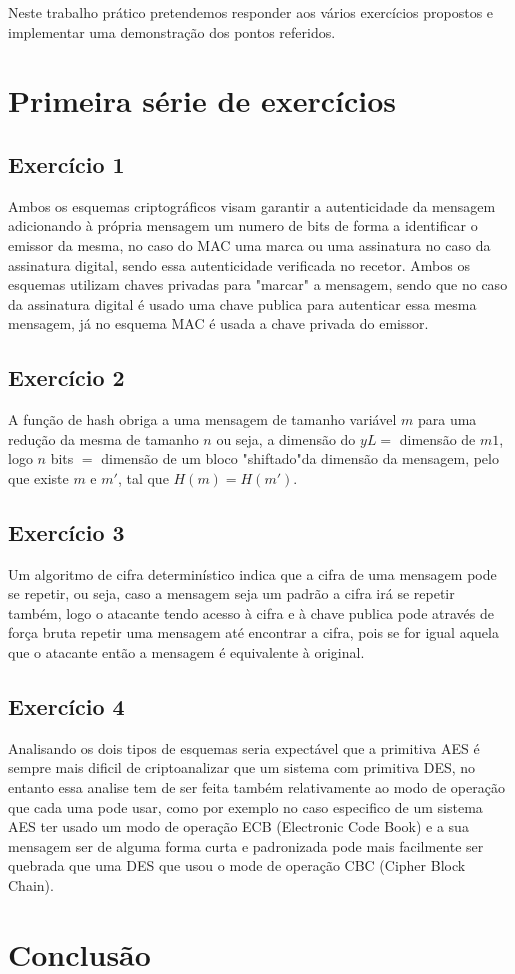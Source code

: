 \documentclass[11pt]{report}
\begin{document}
Neste trabalho prático pretendemos responder aos vários exercícios propostos e implementar uma demonstração dos pontos referidos.

\newpage

\section{Primeira série de exercícios}
\subsection{Exercício 1}

Ambos os esquemas criptográficos visam garantir a autenticidade da mensagem adicionando à própria mensagem um numero de bits de forma a identificar o emissor da mesma, no caso do MAC uma marca ou uma assinatura no caso da assinatura digital, sendo essa autenticidade verificada no recetor. Ambos os esquemas utilizam chaves privadas para "marcar" \space a mensagem, sendo que no caso da assinatura digital é usado uma chave publica para autenticar essa mesma mensagem, já no esquema MAC é usada a chave privada do emissor.\\

\subsection{Exercício 2}
A função de hash obriga a uma mensagem de tamanho variável $ m $ para uma redução da mesma de tamanho $ n $ ou seja, a dimensão do $ yL = $ dimensão de $ m1 $, logo $ n $ bits $ = $ dimensão de um bloco "shiftado"\space da dimensão da mensagem, pelo que existe $ m $ e $ m' $, tal que $ H(m) = H(m')$.\\

\subsection{Exercício 3}
Um algoritmo de cifra determinístico indica que a cifra de uma mensagem pode se repetir, ou seja, caso a mensagem seja um padrão a cifra irá se repetir também, logo o atacante tendo acesso à cifra e à chave publica pode através de força bruta repetir uma mensagem até encontrar a cifra, pois se for igual aquela que o atacante então a mensagem é equivalente à original.\\

\subsection{Exercício 4}
Analisando os dois tipos de esquemas seria expectável que a primitiva AES é sempre mais dificil de criptoanalizar que um sistema com primitiva DES, no entanto essa analise tem de ser feita também relativamente ao modo de operação que cada uma pode usar, como por exemplo no caso especifico de um sistema AES ter usado um modo de operação ECB (Electronic Code Book) e a sua mensagem ser de alguma forma curta e padronizada pode mais facilmente ser quebrada que uma DES que usou o mode de operação CBC (Cipher Block Chain).

\newpage



\section{Conclusão}
\end{document}
